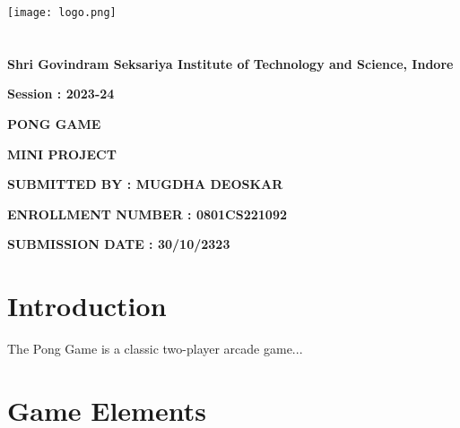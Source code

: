 \documentclass[16pt]{article}
\begin{document}
\begin{titlepage}
\centering

\texttt{[image: logo.png]} %

\section{\vspace{1cm}}
{\Huge \textbf{Shri Govindram Seksariya Institute of Technology and Science, Indore}}
\vspace{1cm}

{\LARGE \textbf{Session : 2023-24}}
\vspace{1cm}

{\Huge \textbf{PONG GAME}}
\vspace{1cm}

{\Huge \textbf{MINI PROJECT}}
\vspace{1cm}

\begin{flushleft}
  \LARGE \textbf{SUBMITTED BY : MUGDHA DEOSKAR}
\end{flushleft}
\vspace{1cm}

\begin{flushleft}
  \LARGE \textbf{ENROLLMENT NUMBER : 0801CS221092}
  \vspace{2cm}
\end{flushleft}

\begin{flushleft}
  \LARGE \textbf{SUBMISSION DATE : 30/10/2323}
  \vspace{1cm}
\end{flushleft}
\end{titlepage}

\newpage

\section*{Introduction}

\begin{flushleft}
\Large The Pong Game is a classic two-player arcade game...
\end{flushleft}


\section*{Game Elements}
\end{document}
